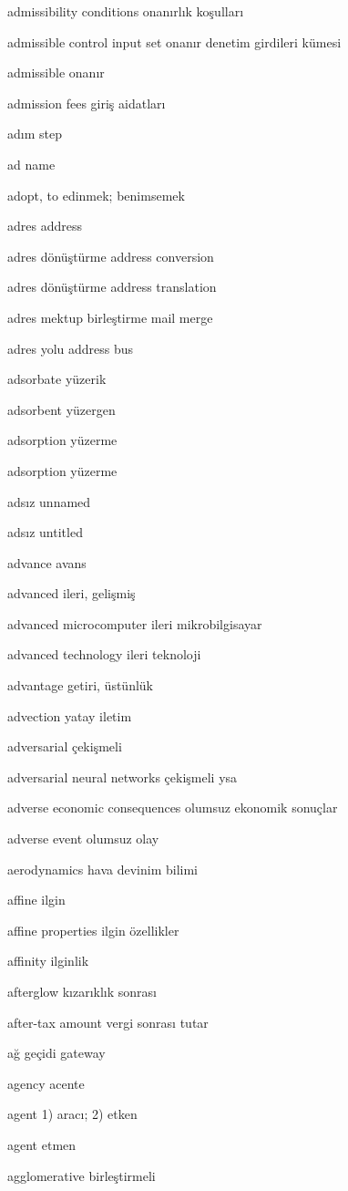\documentclass[12pt,fleqn]{article}\usepackage{../../common}
\begin{document}
admissibility conditions onanırlık koşulları

admissible control input set onanır denetim girdileri kümesi

admissible onanır

admission fees giriş aidatları

adım step

ad name

adopt, to edinmek; benimsemek

adres address

adres dönüştürme address conversion

adres dönüştürme address translation

adres mektup birleştirme mail merge

adres yolu address bus

adsorbate yüzerik

adsorbent yüzergen

adsorption yüzerme

adsorption yüzerme

adsız unnamed

adsız untitled

advance avans

advanced ileri, gelişmiş

advanced microcomputer ileri mikrobilgisayar

advanced technology ileri teknoloji

advantage getiri, üstünlük

advection yatay iletim

adversarial çekişmeli

adversarial neural networks çekişmeli ysa

adverse economic consequences olumsuz ekonomik sonuçlar

adverse event olumsuz olay

aerodynamics hava devinim bilimi

affine ilgin 

affine properties ilgin özellikler

affinity ilginlik

afterglow kızarıklık sonrası

after-tax amount vergi sonrası tutar

ağ geçidi gateway

agency acente

agent 1) aracı; 2) etken

agent etmen

agglomerative birleştirmeli
\end{document}
